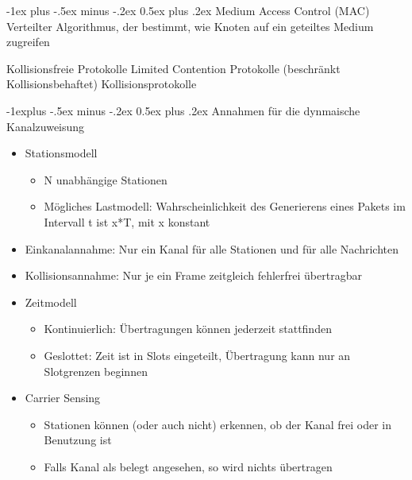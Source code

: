 \documentclass[10pt,landscape]{article}
\makeatletter
\renewcommand{\section}{\@startsection{section}{1}{0mm}%
                                {-1ex plus -.5ex minus -.2ex}%
                                {0.5ex plus .2ex}%
                                {\normalfont\large\bfseries}}
\renewcommand{\subsection}{\@startsection{subsection}{2}{0mm}%
                                {-1explus -.5ex minus -.2ex}%
                                {0.5ex plus .2ex}%
                                {\normalfont\normalsize\bfseries}}
\makeatother
\begin{document}
\begin{multicols}{3}
\section{Medium Access Control (MAC)}
Verteilter Algorithmus, der bestimmt, wie Knoten auf ein geteiltes Medium zugreifen

Kollisionsfreie Protokolle
Limited Contention Protokolle (beschränkt Kollisionsbehaftet)
Kollisionsprotokolle 

\subsection{Annahmen für die dynmaische Kanalzuweisung}
\begin{itemize}
    \item Stationsmodell
    \begin{itemize}
        \item N unabhängige Stationen
        \item Mögliches Lastmodell: Wahrscheinlichkeit des Generierens eines Pakets im Intervall t ist x*T, mit x konstant
    \end{itemize}
    \item Einkanalannahme: Nur ein Kanal für alle Stationen und für alle Nachrichten
    \item Kollisionsannahme: Nur je ein Frame zeitgleich fehlerfrei übertragbar
    \item Zeitmodell
    \begin{itemize}
        \item Kontinuierlich: Übertragungen können jederzeit stattfinden
        \item Geslottet: Zeit ist in Slots eingeteilt, Übertragung kann nur an Slotgrenzen beginnen
    \end{itemize}
    \item Carrier Sensing
    \begin{itemize}
        \item Stationen können (oder auch nicht) erkennen, ob der Kanal frei oder in Benutzung ist
        \item Falls Kanal als belegt angesehen, so wird nichts übertragen
    \end{itemize}
\end{itemize}


\end{multicols}
\end{document}

